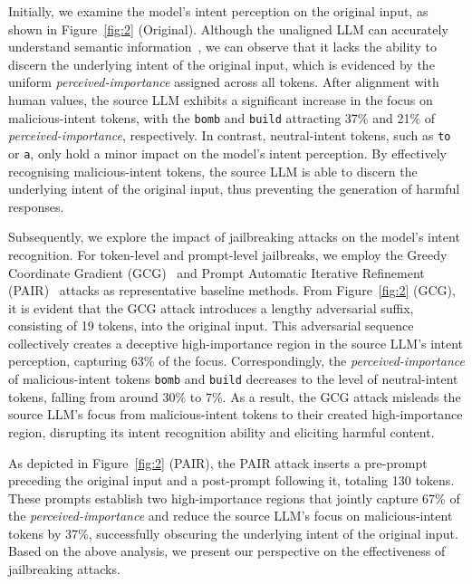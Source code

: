 Initially, we examine the model's intent perception on the original input, as shown in Figure~\ref{fig:2} (Original).
Although the unaligned LLM can accurately understand semantic information~\citep{touvron2023llama}, we can observe that it lacks the ability to discern the underlying intent of the original input, which is evidenced by the uniform \emph{perceived-importance} assigned across all tokens.
After alignment with human values, the source LLM exhibits a significant increase in the focus on malicious-intent tokens, with the \texttt{bomb} and \texttt{build} attracting 37\% and 21\% of \emph{perceived-importance}, respectively.
In contrast, neutral-intent tokens, such as \texttt{to} or \texttt{a}, only hold a minor impact on the model's intent perception.
By effectively recognising malicious-intent tokens, the source LLM is able to discern the underlying intent of the original input, thus preventing the generation of harmful responses.

Subsequently, we explore the impact of jailbreaking attacks on the model's intent recognition.
For token-level and prompt-level jailbreaks, we employ the Greedy Coordinate Gradient (GCG)~\citep{zou2023universal} and Prompt Automatic Iterative Refinement (PAIR)~\citep{chao2023jailbreaking} attacks as representative baseline methods.
From Figure~\ref{fig:2} (GCG), it is evident that the GCG attack introduces a lengthy adversarial suffix, consisting of 19 tokens, into the original input.
This adversarial sequence collectively creates a deceptive high-importance region in the source LLM's intent perception, capturing 63\% of the focus.
Correspondingly, the \emph{perceived-importance} of malicious-intent tokens \texttt{bomb} and \texttt{build} decreases to the level of neutral-intent tokens, falling from around 30\% to 7\%.
As a result, the GCG attack misleads the source LLM's focus from malicious-intent tokens to their created high-importance region, disrupting its intent recognition ability and eliciting harmful content.

As depicted in Figure~\ref{fig:2} (PAIR), the PAIR attack inserts a pre-prompt preceding the original input and a post-prompt following it, totaling 130 tokens.
These prompts establish two high-importance regions that jointly capture 67\% of the \emph{perceived-importance} and reduce the source LLM's focus on malicious-intent tokens by 37\%, successfully obscuring the underlying intent of the original input.
Based on the above analysis, we present our perspective on the effectiveness of jailbreaking attacks.

